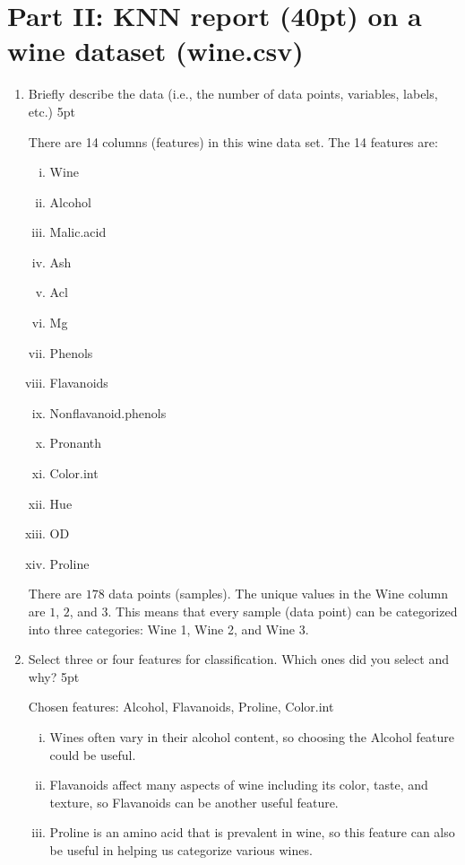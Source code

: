 \documentclass[12pt]{article}
\begin{document}
\section*{Part II: KNN report (40pt) on a wine dataset (wine.csv)}
\begin{enumerate}[(1)]
    \item Briefly describe the data (i.e., the number of data points, variables, labels, etc.) 5pt
    \begin{mdframed}
        There are 14 columns (features) in this wine data set. The 14 features are:
        \begin{enumerate}[(i)]
            \item Wine 
            \item Alcohol
            \item Malic.acid
            \item Ash 
            \item Acl 
            \item Mg 
            \item Phenols 
            \item Flavanoids 
            \item Nonflavanoid.phenols
            \item Pronanth
            \item Color.int 
            \item Hue 
            \item OD 
            \item Proline
        \end{enumerate}
        There are $178$ data points (samples). The unique values in the Wine column are $1$, $2$, and $3$. This means that every sample (data point) can be categorized into three categories: Wine 1, Wine 2, and Wine 3.
    \end{mdframed}
    \item Select three or four features for classification. Which ones did you select and why? 5pt
    \begin{mdframed}
        Chosen features: Alcohol, Flavanoids, Proline, Color.int
        \begin{enumerate}[(i)]
            \item Wines often vary in their alcohol content, so choosing the Alcohol feature could be useful.
            \item Flavanoids affect many aspects of wine including its color, taste, and texture, so Flavanoids can be another useful feature.
            \item Proline is an amino acid that is prevalent in wine, so this feature can also be useful in helping us categorize various wines.

\end{enumerate}
\end{mdframed}
\end{enumerate}
\end{document}
